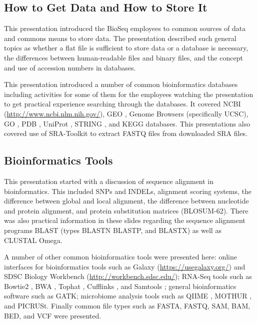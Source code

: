 \documentclass{report}
\begin{document}
\subsection{How to Get Data and How to Store It}
This presentation introduced the BioSeq employees to common sources of data and commons means to store data. The presentation described such general topics as whether a flat file is sufficient to store data or a database is necessary, the differences between human-readable files and binary files, and the concept and use of accession numbers in databases.

This presentation introduced a number of common bioinformatics databases including activities for some of them for the employees watching the presentation to get practical experience searching through the databases. It covered NCBI (\url{http://www.ncbi.nlm.nih.gov/}), GEO \cite{edgar2002gene}, Genome Browsers (specifically UCSC), GO \cite{ashburner2000gene}, PDB \cite{berman2000protein}, UniProt \cite{apweiler2004uniprot}, STRING \cite{von2003string}, and KEGG \cite{ogata1999kegg} databases. This presentations also covered use of SRA-Toolkit \cite{leinonen2010sequence} to extract FASTQ files from downloaded SRA files.

\subsection{Bioinformatics Tools}
This presentation started with a discussion of sequence alignment in bioinformatics. This included SNPs and INDELs, alignment scoring systems, the difference between global and local alignment, the difference between nucleotide and protein alignment, and protein substitution matrices (BLOSUM-62). There was also practical information in these slides regarding the sequence alignment programs BLAST (types BLASTN BLASTP, and BLASTX) as well as CLUSTAL Omega.

A number of other common bioinformatics tools were presented here: online interfaces for bioinformatics tools such as Galaxy (\url{https://usegalaxy.org/}) and SDSC Biology Workbench (\url{http://workbench.sdsc.edu/}); RNA-Seq tools such as Bowtie2 \cite{langmead2012fast}, BWA \cite{li2009fast}, Tophat \cite{trapnell2009tophat}, Cufflinks \cite{trapnell2012differential}, and Samtools \cite{li2009sequence}; general bioinformatics software such as GATK; microbiome analysis tools such as QIIME \cite{caporaso2010qiime}, MOTHUR \cite{schloss2009introducing}, and PICRUSt. Finally common file types such as FASTA, FASTQ, SAM, BAM, BED, and VCF were presented.
\end{document}
